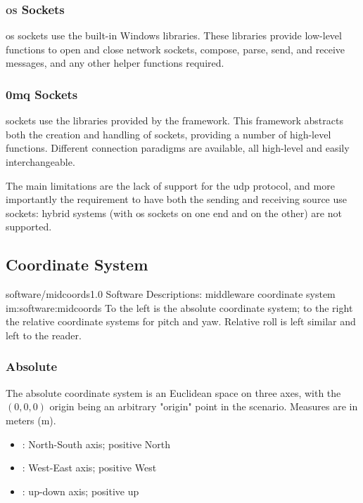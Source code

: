\subsubsection{\textsc{os} Sockets}

\gls{os} sockets use the built-in Windows  libraries. These libraries provide low-level functions to open and close network sockets, compose, parse, send, and receive messages, and any other helper functions required.

\subsubsection{0mq Sockets}

 sockets use the libraries provided by the  framework. This framework abstracts both the creation and handling of sockets, providing a number of high-level functions. Different connection paradigms are available, all high-level and easily interchangeable.

The main limitations are the lack of support for the \gls{udp} protocol, and more importantly the requirement to have both the sending and receiving source use  sockets: hybrid systems (with \gls{os} sockets on one end and  on the other) are not supported.

\subsection{Coordinate System}

\begin{image}
	{software/midcoords}{1.0}
	{Software Descriptions: \gls{middleware} coordinate system}
	{im:software:midcoords}
	{}
	{To the left is the absolute coordinate system; to the right the relative coordinate systems for pitch and yaw. Relative roll is left similar and left to the reader.}
\end{image}

\subsubsection{Absolute}

The absolute coordinate system is an Euclidean space on three axes, with the $(0,0,0)$ origin being an arbitrary "origin" point in the scenario. Measures are in meters (\si{\meter}).

\begin{itemize}
	\item {}: North-South axis; positive North
	\item {}: West-East axis; positive West
	\item {}: up-down axis; positive up
\end{itemize}

